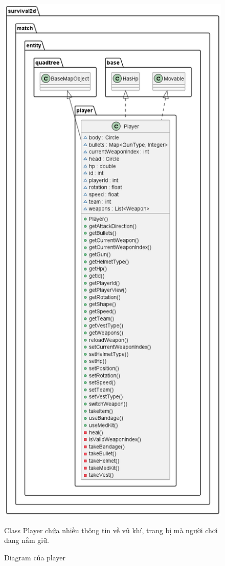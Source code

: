 \documentclass[12pt,a4paper]{article}
\begin{document}
  \begin{figure}[H]
    \centering
    \includegraphics[width=\textwidth,height=0.95\textheight,keepaspectratio]{Img/uml/player.png}
    \caption{Diagram của player}
    Class Player chứa nhiều thông tin về vũ khí, trang bị mà người chơi đang nắm giữ.
  \end{figure}
\end{document}
